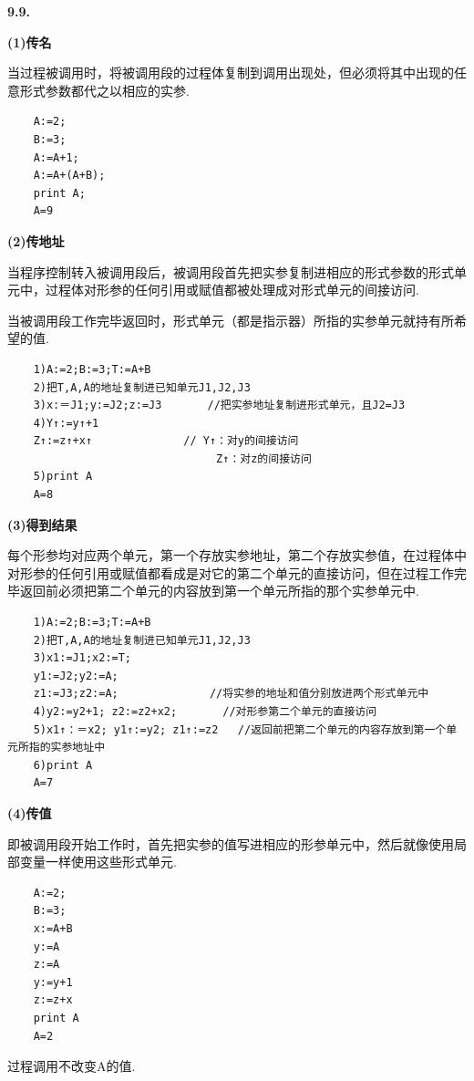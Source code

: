 \documentclass{article}
\begin{document}
\textbf{9.9.}

\textbf{(1)传名}

当过程被调用时，将被调用段的过程体复制到调用出现处，但必须将其中出现的任意形式参数都代之以相应的实参.
\begin{verbatim}
    A:=2;                                  
    B:=3;                                
    A:=A+1;                             
    A:=A+(A+B);                    
    print A;   
    A=9  
\end{verbatim}

\textbf{(2)传地址}

当程序控制转入被调用段后，被调用段首先把实参复制进相应的形式参数的形式单元中，过程体对形参的任何引用或赋值都被处理成对形式单元的间接访问.

当被调用段工作完毕返回时，形式单元（都是指示器）所指的实参单元就持有所希望的值.

\begin{verbatim}
    1)A:=2;B:=3;T:=A+B
    2)把T,A,A的地址复制进已知单元J1,J2,J3
    3)x:＝J1;y:=J2;z:=J3       //把实参地址复制进形式单元，且J2=J3
    4)Y↑:=y↑+1
    Z↑:=z↑+x↑              // Y↑：对y的间接访问
                                Z↑：对z的间接访问
    5)print A
    A=8
\end{verbatim}

\textbf{(3)得到结果}

每个形参均对应两个单元，第一个存放实参地址，第二个存放实参值，在过程体中对形参的任何引用或赋值都看成是对它的第二个单元的直接访问，但在过程工作完毕返回前必须把第二个单元的内容放到第一个单元所指的那个实参单元中.
\begin{verbatim}
    1)A:=2;B:=3;T:=A+B
    2)把T,A,A的地址复制进已知单元J1,J2,J3
    3)x1:=J1;x2:=T;
    y1:=J2;y2:=A;
    z1:=J3;z2:=A;              //将实参的地址和值分别放进两个形式单元中
    4)y2:=y2+1; z2:=z2+x2;       //对形参第二个单元的直接访问
    5)x1↑：＝x2; y1↑:=y2; z1↑:=z2   //返回前把第二个单元的内容存放到第一个单元所指的实参地址中
    6)print A
    A=7
\end{verbatim}

\textbf{(4)传值}

即被调用段开始工作时，首先把实参的值写进相应的形参单元中，然后就像使用局部变量一样使用这些形式单元.
\begin{verbatim}
    A:=2;
    B:=3;
    x:=A+B
    y:=A
    z:=A
    y:=y+1
    z:=z+x
    print A
    A=2
\end{verbatim}

过程调用不改变A的值.
\end{document}
